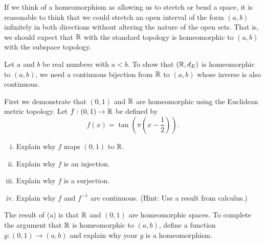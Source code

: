 
If we think of a homeomorphism as allowing us to stretch or bend a space, it is reasonable to think that we could stretch an open interval of the form $(a,b)$ infinitely in both directions without altering the nature of the open sets. That is, we should expect that $\mathbb{R}$ with the standard topology is homeomorphic to $(a,b)$ with the subspace topology.   

\begin{activity} Let $a$ and $b$ be real numbers with $a < b$. To show that $(\mathbb{R}, d_E)$ is homeomorphic to $(a,b)$, we need a continuous bijection from $\mathbb{R}$ to $(a,b)$ whose inverse is also continuous. 
\ba
\item First we demonstrate that $(0,1)$ and $\mathbb{R}$ are homeomorphic using the Euclidean metric topology. Let $f : (0,1) \to \mathbb{R}$ be defined by 
\[f(x) = \tan\left(\pi\left(x-\frac{1}{2}\right)\right).\]
	\begin{enumerate}[i.]
	\item Explain why $f$ maps $(0,1)$ to $\mathbb{R}$.
	
	\item Explain why $f$ is an injection.
	
	\item Explain why $f$ is a surjection.
	
	\item Explain why $f$ and $f^{-1}$ are continuous. (Hint: Use a result from calculus.) 
	
	\end{enumerate}

\item The result of (a) is that $\mathbb{R}$ and $(0,1)$ are homeomorphic spaces. To complete the argument that $\mathbb{R}$ is homeomorphic to $(a,b)$, define a function $g: (0,1) \to (a,b)$ and explain why your $g$ is a homeomorphism.

\ea

\end{activity}

